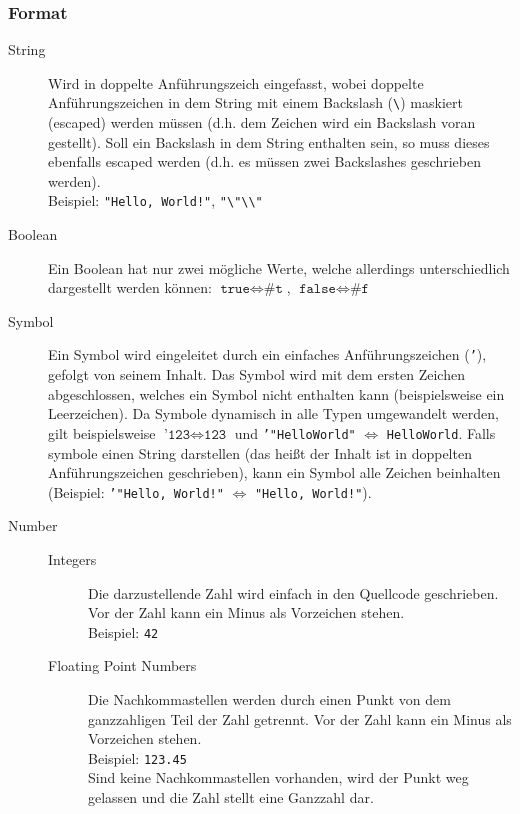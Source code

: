 \documentclass[a4paper, 11pt, accentcolor = tud3b]{tudreport}
\begin{document}
            \subsubsection{Format}
                \begin{description}
                    \item[String] Wird in doppelte Anführungszeich eingefasst, wobei doppelte Anführungszeichen in dem String mit einem Backslash (\texttt{\textbackslash}) maskiert (escaped) werden müssen (d.h. dem Zeichen wird ein Backslash voran gestellt). Soll ein Backslash in dem String enthalten sein, so muss dieses ebenfalls escaped werden (d.h. es müssen zwei Backslashes geschrieben werden). \\ Beispiel: \texttt{"Hello, World!"}, \texttt{"\textbackslash"\textbackslash\textbackslash"}
                    \item[Boolean] Ein Boolean hat nur zwei mögliche Werte, welche allerdings unterschiedlich dargestellt werden können: $ \texttt{true} \iff \texttt{\#t} $, $ \texttt{false} \iff \texttt{\#f} $
                    \item[Symbol] Ein Symbol wird eingeleitet durch ein einfaches Anführungszeichen (\texttt{'}), gefolgt von seinem Inhalt. Das Symbol wird mit dem ersten Zeichen abgeschlossen, welches ein Symbol nicht enthalten kann (beispielsweise ein Leerzeichen). Da Symbole dynamisch in alle Typen umgewandelt werden, gilt beispielsweise $ \texttt{'123} \iff \texttt{123} $
                    und \texttt{'"HelloWorld"} $ \iff $ \texttt{HelloWorld}. Falls symbole einen String darstellen (das heißt der Inhalt ist in doppelten Anführungszeichen geschrieben), kann ein Symbol alle Zeichen beinhalten (Beispiel: \texttt{'"Hello, World!"} $ \iff $ \texttt{"Hello, World!"}).
                    \item[Number]
                        \begin{description}
                            \item[Integers] Die darzustellende Zahl wird einfach in den Quellcode geschrieben. Vor der Zahl kann ein Minus als Vorzeichen stehen. \\ Beispiel: \texttt{42}
                            \item[Floating Point Numbers] Die Nachkommastellen werden durch einen Punkt von dem ganzzahligen Teil der Zahl getrennt. Vor der Zahl kann ein Minus als Vorzeichen stehen. \\ Beispiel: \texttt{123.45} \\ Sind keine Nachkommastellen vorhanden, wird der Punkt weg gelassen und die Zahl stellt eine Ganzzahl dar.

\end{description}
\end{description}
\end{document}
